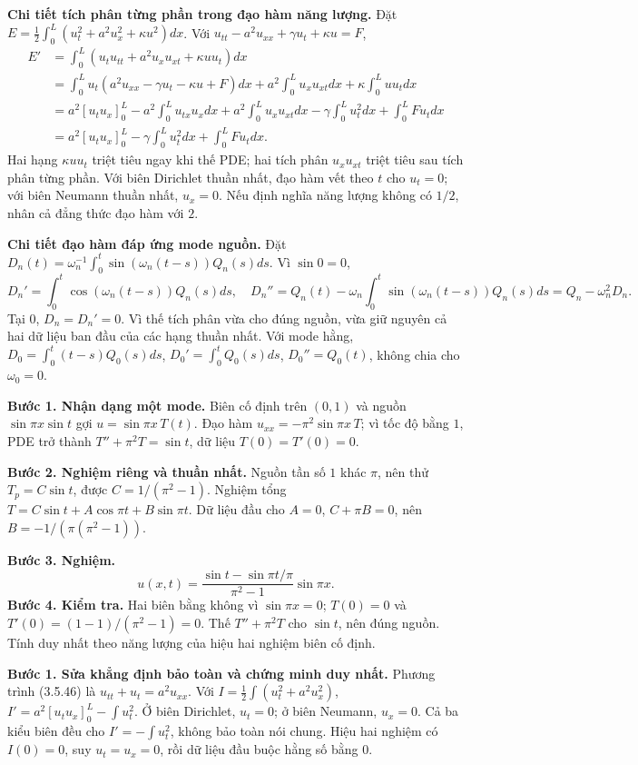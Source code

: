 \textbf{Chi tiết tích phân từng phần trong đạo hàm năng lượng.} Đặt $E=\frac12\int_0^L(u_t^2+a^2u_x^2+\kappa u^2)dx$. Với $u_{tt}-a^2u_{xx}+\gamma u_t+\kappa u=F$,
\[\begin{aligned}
E'&=\int_0^L(u_tu_{tt}+a^2u_xu_{xt}+\kappa uu_t)dx\\
&=\int_0^Lu_t(a^2u_{xx}-\gamma u_t-\kappa u+F)dx
+a^2\int_0^Lu_xu_{xt}dx+\kappa\int_0^Luu_tdx\\
&=a^2[u_tu_x]_0^L-a^2\int_0^Lu_{tx}u_xdx
+a^2\int_0^Lu_xu_{xt}dx-\gamma\int_0^Lu_t^2dx+\int_0^LFu_tdx\\
&=a^2[u_tu_x]_0^L-\gamma\int_0^Lu_t^2dx+\int_0^LFu_tdx.
\end{aligned}\]
Hai hạng $\kappa uu_t$ triệt tiêu ngay khi thế PDE; hai tích phân $u_xu_{xt}$ triệt tiêu sau tích phân từng phần. Với biên Dirichlet thuần nhất, đạo hàm vết theo $t$ cho $u_t=0$; với biên Neumann thuần nhất, $u_x=0$. Nếu định nghĩa năng lượng không có $1/2$, nhân cả đẳng thức đạo hàm với $2$.

\textbf{Chi tiết đạo hàm đáp ứng mode nguồn.} Đặt $D_n(t)=\omega_n^{-1}\int_0^t\sin(\omega_n(t-s))Q_n(s)ds$. Vì $\sin0=0$,
\[D_n'=\int_0^t\cos(\omega_n(t-s))Q_n(s)ds,\quad
D_n''=Q_n(t)-\omega_n\int_0^t\sin(\omega_n(t-s))Q_n(s)ds=Q_n-\omega_n^2D_n.\]
Tại $0$, $D_n=D_n'=0$. Vì thế tích phân vừa cho đúng nguồn, vừa giữ nguyên cả hai dữ liệu ban đầu của các hạng thuần nhất. Với mode hằng, $D_0=\int_0^t(t-s)Q_0(s)ds$, $D_0'=\int_0^tQ_0(s)ds$, $D_0''=Q_0(t)$, không chia cho $\omega_0=0$.

\textbf{Bước 1. Nhận dạng một mode.} Biên cố định trên $(0,1)$ và nguồn $\sin\pi x\sin t$ gợi $u=\sin\pi x\,T(t)$. Đạo hàm $u_{xx}=-\pi^2\sin\pi x\,T$; vì tốc độ bằng $1$, PDE trở thành $T''+\pi^2T=\sin t$, dữ liệu $T(0)=T'(0)=0$.

\textbf{Bước 2. Nghiệm riêng và thuần nhất.} Nguồn tần số $1$ khác $\pi$, nên thử $T_p=C\sin t$, được $C=1/(\pi^2-1)$. Nghiệm tổng $T=C\sin t+A\cos\pi t+B\sin\pi t$. Dữ liệu đầu cho $A=0$, $C+\pi B=0$, nên $B=-1/(\pi(\pi^2-1))$.

\textbf{Bước 3. Nghiệm.}
\[u(x,t)=\frac{\sin t-\sin\pi t/\pi}{\pi^2-1}\sin\pi x.\]
\textbf{Bước 4. Kiểm tra.} Hai biên bằng không vì $\sin\pi x=0$; $T(0)=0$ và $T'(0)=(1-1)/(\pi^2-1)=0$. Thế $T''+\pi^2T$ cho $\sin t$, nên đúng nguồn. Tính duy nhất theo năng lượng của hiệu hai nghiệm biên cố định.

\textbf{Bước 1. Sửa khẳng định bảo toàn và chứng minh duy nhất.} Phương trình (3.5.46) là $u_{tt}+u_t=a^2u_{xx}$. Với $I=\frac12\int(u_t^2+a^2u_x^2)$, $I'=a^2[u_tu_x]_0^L-\int u_t^2$. Ở biên Dirichlet, $u_t=0$; ở biên Neumann, $u_x=0$. Cả ba kiểu biên đều cho $I'=-\int u_t^2$, không bảo toàn nói chung. Hiệu hai nghiệm có $I(0)=0$, suy $u_t=u_x=0$, rồi dữ liệu đầu buộc hằng số bằng $0$.

